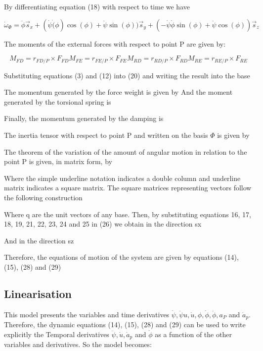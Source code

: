 \documentclass[sublist,a4paper,twoside,11pt]{article}
\begin{document}
By differentiating equation (18) with respect to time we have

\begin{equation}
\dot{\omega}_\Phi = \ddot{\phi}\vec{s}_x + (\dot{\psi}\dot(\phi)\cos(\phi) + \ddot{\psi}\sin(\phi)) \vec{s}_y + 
(-\dot{\psi}\dot{\phi}\sin(\phi) + \ddot{\psi}\cos(\phi))\vec{s}_z
\end{equation}


The moments of the external forces with respect to point P are given by:

\begin{subequations}
	\begin{equation}
	M_{FD} = r_{FD/P} \times F_{FD}
	\end{equation}
	\begin{equation}
	M_{FE} = r_{FE/P} \times F_{FE}
	\end{equation}
	\begin{equation}
	M_{RD} = r_{RD/P} \times F_{RD}
	\end{equation}
	\begin{equation}
	M_{RE} = r_{RE/P} \times F_{RE}
	\end{equation}
\end{subequations}


Substituting equations (3) and (12) into (20) and writing the result into the base

The momentum generated by the force weight is given by
And the moment generated by the torsional spring is

Finally, the momentum generated by the damping is

The inertia tensor with respect to point P and written on the basis $\Phi$ is given by

The theorem of the variation of the amount of angular motion in relation to the point P is given, in matrix form, by


Where the simple underline notation indicates a double column and underline matrix indicates a square matrix. The square matrices representing vectors follow the following construction

Where q are the unit vectors of any base.
Then, by substituting equations 16, 17, 18, 19, 21, 22, 23, 24 and 25 in (26) we obtain in the direction sx

And in the direction sz

Therefore, the equations of motion of the system are given by equations (14), (15), (28) and (29)

\subsection{Linearisation}
This model presents the variables and time derivatives $\dot{\psi} ,\ddot{\psi} u,\dot{u}, \phi,\dot{\phi},\ddot{\phi},a_P$  and $\dot{a}_p$.  Therefore, the dynamic equations (14), (15), (28) and (29) can be used to write explicitly the Temporal derivatives $\ddot{\psi}, \dot{u}, \dot{a}_p$ and $\dot{\phi}$ as a function of the other variables and derivatives. So the model becomes:
\end{document}

